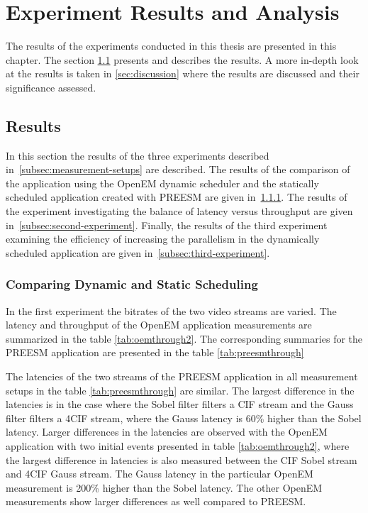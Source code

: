 \chapter{Experiment Results and Analysis}
\label{chapter:results-and-analysis}
The results of the experiments conducted in this thesis are presented in this chapter. The section \ref{sec:results} presents and describes the results. A more in-depth look at the results is taken in \ref{sec:discussion} where the results are discussed and their significance assessed.

\section{Results}
\label{sec:results}
In this section the results of the three experiments described in~\ref{subsec:measurement-setups} are described. The results of the comparison of the application using the OpenEM dynamic scheduler and the statically scheduled application created with PREESM are given in~\ref{subsec:first-experiment}. The results of the experiment investigating the balance of latency versus throughput are given in~\ref{subsec:second-experiment}. Finally, the results of the third experiment examining the efficiency of increasing the parallelism in the dynamically scheduled application are given in~\ref{subsec:third-experiment}.

\subsection{Comparing Dynamic and Static Scheduling}
\label{subsec:first-experiment}
\FloatBarrier
In the first experiment the bitrates of the two video streams are varied. The latency and throughput of the OpenEM application measurements are summarized in the table \ref{tab:oemthrough2}. The corresponding summaries for the PREESM application are presented in the table \ref{tab:preesmthrough}

The latencies of the two streams of the PREESM application in all measurement setups in the table \ref{tab:preesmthrough} are similar. The largest difference in the latencies is in the case where the Sobel filter filters a CIF stream and the Gauss filter filters a 4CIF stream, where the Gauss latency is 60\% higher than the Sobel latency. Larger differences in the latencies are observed with the OpenEM application with two initial events presented in table \ref{tab:oemthrough2}, where the largest difference in latencies is also measured between the CIF Sobel stream and 4CIF Gauss stream. The Gauss latency in the particular OpenEM measurement is 200\% higher than the Sobel latency. The other OpenEM measurements show larger differences as well compared to PREESM.

